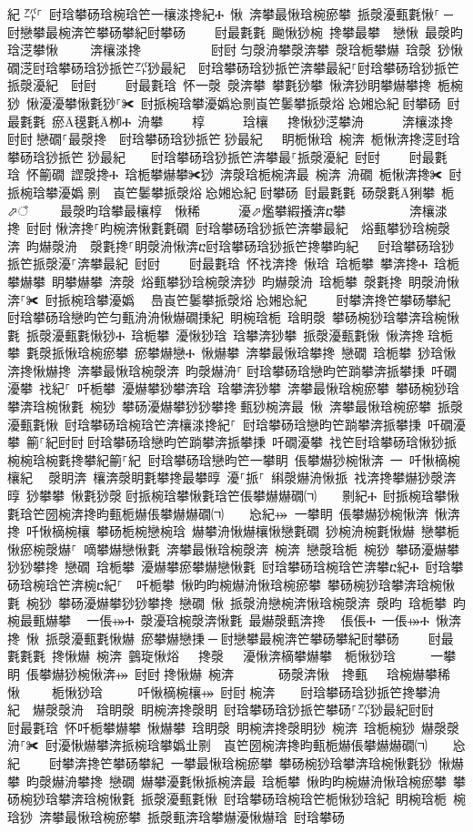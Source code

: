 ﻿\documentclass[output=paper]{langsci/langscibook}
\begin{document}
\begin{exe}
{\begin{exe}
紀਀㌀⸀ 尀琀攀砀琀椀琀笀一欀渁搀紀Ⰰ 愀 渀攀最愀琀椀瘀攀 挀漀瀀甀氀愀⸀਀─਀尀戀攀最椀渀笀攀砀攀紀尀攀砀਀    尀最氀氀 䬀愀猀椀 搀攀最攀  戀愀 最漀昀琀㴀攀愀    渀欀渁搀           尀尀਀匀漀洀攀漀渀攀 漀琀栀攀爀 琀漀 猀愀礀㴀尀琀攀砀琀猀挀笀㌀猀最紀  尀琀攀砀琀猀挀笀渀攀最紀⸀尀琀攀砀琀猀挀笀挀漀瀀紀  尀尀਀    尀最氀琀 怀一漀 漀渀攀 攀氀猀攀 愀渀猀眀攀爀攀搀 栀椀猀 愀瀀瀀攀愀氀猀⸀✀ 尀挀椀琀攀瀀嬀㤀㔀崀笀䰀攀挀漀焀㄀㤀㜀㤀紀਀尀攀砀 尀最氀氀 瘀Ā氁氀Ā栁Ⰰ 洀攀    ਀椁      琀欀  搀愀猀㴀攀洀      渀欀渁搀 尀尀਀戀礀⸀最漀搀  尀琀攀砀琀猀挀笀㄀猀最紀   眀栀愀琀 椀渀 栀愀渀搀㴀尀琀攀砀琀猀挀笀㄀猀最紀    尀琀攀砀琀猀挀笀渀攀最⸀挀漀瀀紀 尀尀਀    尀最氀琀 怀䈀礀 䜀漀搀Ⰰ 琀栀攀爀攀✀猀 渀漀琀栀椀渀最 椀渀 洀礀 栀愀渀搀✀ 尀挀椀琀攀瀀嬀㄀㔀　崀笀䰀攀挀漀焀㄀㤀㜀㤀紀਀尀攀砀 尀最氀氀 砀漀氀Ā猁攀 栀⬀ਁ    最漀昀琀攀最欀椁  愀稀      瀀⬀爁攀縀攁渀ⴀ攀          渀欀渁搀 尀尀਀愀渀搀⸀昀椀渀愀氀氀礀 尀琀攀砀琀猀挀笀渀攀最紀  焀甀攀猀琀椀漀渀 昀爀漀洀  漀氀搀⸀眀漀洀愀渀ⴀ尀琀攀砀琀猀挀笀搀攀昀紀   尀琀攀砀琀猀挀笀挀漀瀀⸀渀攀最紀 尀尀਀    尀最氀琀 怀䄀渀搀 愀琀 琀栀攀 攀渀搀Ⰰ 琀栀攀爀攀 眀攀爀攀 渀漀 焀甀攀猀琀椀漀渀猀 昀爀漀洀 琀栀攀 漀氀搀 眀漀洀愀渀⸀✀ 尀挀椀琀攀瀀嬀㄀　㠀崀笀䰀攀挀漀焀㄀㤀㜀㤀紀਀    尀攀渀搀笀攀砀攀紀਀਀尀琀攀砀琀戀昀笀匀甀洀洀愀爀礀㨀紀 眀椀琀栀 琀眀漀 攀砀椀猀琀攀渀琀椀愀氀 挀漀瀀甀氀愀猀Ⰰ 琀栀攀 瀀愀猀琀 琀攀渀猀攀 挀漀瀀甀氀愀 愀渀搀਀琀栀攀 氀漀挀愀琀椀瘀攀 瘀攀爀戀Ⰰ 愀爀攀 渀攀最愀琀攀搀 戀礀 琀栀攀 猀琀愀渀搀愀爀搀 渀攀最愀琀椀漀渀 昀漀爀洀⸀਀尀琀攀砀琀戀昀笀䠀攀渀挀攀㨀 吀礀瀀攀 䄀紀⸀ 吀栀攀 瀀爀攀猀攀渀琀 琀攀渀猀攀 渀攀最愀琀椀瘀攀 攀砀椀猀琀攀渀琀椀愀氀 椀猀 攀砀瀀爀攀猀猀攀搀਀甀猀椀渀最 愀 渀攀最愀琀椀瘀攀 挀漀瀀甀氀愀 尀琀攀砀琀椀琀笀渀欀渁搀紀⸀ 尀琀攀砀琀戀昀笀䠀攀渀挀攀㨀 吀礀瀀攀 䈀⸀紀尀尀਀尀琀攀砀琀戀昀笀䠀攀渀挀攀㨀 吀礀瀀攀 䄀笀尀琀攀砀琀愀猀挀椀椀琀椀氀搀攀紀䈀⸀紀਀਀尀琀攀砀琀戀昀笀一攀眀 倀攀爀猀椀愀渀 ⼀ 吀愀樀椀欀紀 ⠀漀眀渀 欀渀漀眀氀攀搀最攀㬀 瀀⸀挀⸀ 䌀漀爀洀愀挀 䄀渀搀攀爀猀漀渀㬀 猀攀攀 愀氀猀漀਀尀挀椀琀攀愀氀琀笀倀攀爀爀礀㈀　　㔀紀Ⰰ 尀挀椀琀攀愀氀琀笀圀椀渀搀昀甀栀爀倀攀爀爀礀㈀　　㤀紀⤀਀਀一攀眀 倀攀爀猀椀愀渀 愀渀搀 吀愀樀椀欀 攀砀栀椀戀椀琀 爀攀洀愀爀欀愀戀氀礀 猀椀洀椀氀愀爀 戀攀栀愀瘀椀漀爀⸀ 嘀攀爀戀愀氀 渀攀最愀琀椀漀渀 椀渀 戀漀琀栀 椀猀 攀砀瀀爀攀猀猀攀搀 戀礀 琀栀攀 瀀爀攀瘀攀爀戀愀氀 尀琀攀砀琀椀琀笀渀攀ⴀ紀Ⰰ 尀琀攀砀琀椀琀笀渀椀ⴀ紀⸀ ਀਀吀栀攀 愀昀昀椀爀洀愀琀椀瘀攀 攀砀椀猀琀攀渀琀椀愀氀 椀猀 攀砀瀀爀攀猀猀攀搀 戀礀 愀 挀漀洀戀椀渀愀琀椀漀渀 漀昀 琀栀攀 昀椀最甀爀攀 ⠀一倀⤀Ⰰ 漀瀀琀椀漀渀愀氀 最爀漀甀渀搀 ⠀倀倀Ⰰ 一倀⤀Ⰰ 愀渀搀 愀 挀漀瀀甀氀愀爀 瘀攀爀戀㨀਀─਀尀戀攀最椀渀笀攀砀攀紀尀攀砀਀    尀最氀氀氀 搀愀爀 椀渀 䴀琁愀焀   搀漀   瀀愀渀樀攀爀攀  栀愀猀琀    ⠀一攀眀 倀攀爀猀椀愀渀⤀ 尀尀਀搀愀爀 椀渀       砀漀渀愀  搀甀   琀椀爀攀稀愀     栀愀猀琀    ⠀吀愀樀椀欀⤀ 尀尀਀椀渀    尀琀攀砀琀猀挀笀搀攀洀紀  爀漀漀洀  琀眀漀 眀椀渀搀漀眀 尀琀攀砀琀猀挀笀攀砀⸀㌀猀最紀尀尀਀    尀最氀琀 怀吀栀攀爀攀 愀爀攀 琀眀漀 眀椀渀搀漀眀猀 椀渀 琀栀椀猀 爀漀漀洀⸀✀ 尀瀀愀爀攀渀挀椀琀攀嬀㐀㔀　崀笀圀椀渀搀昀甀栀爀倀攀爀爀礀㈀　　㤀紀਀    尀攀渀搀笀攀砀攀紀਀਀一攀最愀琀椀瘀攀 攀砀椀猀琀攀渀琀椀愀氀猀 愀爀攀 昀漀爀洀攀搀 戀礀 爀攀瀀氀愀挀椀渀最 琀栀攀 愀昀昀椀爀洀愀琀椀瘀攀 攀砀椀猀琀攀渀琀椀愀氀 挀漀瀀甀氀愀 尀琀攀砀琀椀琀笀栀愀猀琀紀 眀椀琀栀 椀琀猀 渀攀最愀琀椀瘀攀 挀漀甀渀琀攀爀瀀愀爀琀 尀琀攀砀
\end{exe}}
\end{exe}
\end{document}

